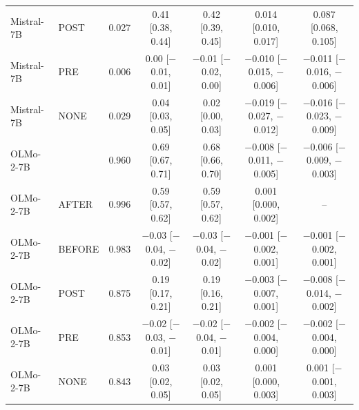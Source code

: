 \begin{tabular}{llccccc}
Mistral-7B & POST & 0.027 & 0.41 [0.38, 0.44] & 0.42 [0.39, 0.45] & 0.014 [0.010, 0.017] & 0.087 [0.068, 0.105] \\
Mistral-7B & PRE & 0.006 & 0.00 [$-$0.01, 0.01] & $-$0.01 [$-$0.02, 0.00] & $-$0.010 [$-$0.015, $-$0.006] & $-$0.011 [$-$0.016, $-$0.006] \\
Mistral-7B & NONE & 0.029 & 0.04 [0.03, 0.05] & 0.02 [0.00, 0.03] & $-$0.019 [$-$0.027, $-$0.012] & $-$0.016 [$-$0.023, $-$0.009] \\
OLMo-2-7B & \fmtOpt{} & 0.960 & 0.69 [0.67, 0.71] & 0.68 [0.66, 0.70] & $-$0.008 [$-$0.011, $-$0.005] & $-$0.006 [$-$0.009, $-$0.003] \\
OLMo-2-7B & AFTER & 0.996 & 0.59 [0.57, 0.62] & 0.59 [0.57, 0.62] & 0.001 [0.000, 0.002] & -- \\
OLMo-2-7B & BEFORE & 0.983 & $-$0.03 [$-$0.04, $-$0.02] & $-$0.03 [$-$0.04, $-$0.02] & $-$0.001 [$-$0.002, 0.001] & $-$0.001 [$-$0.002, 0.001] \\
OLMo-2-7B & POST & 0.875 & 0.19 [0.17, 0.21] & 0.19 [0.16, 0.21] & $-$0.003 [$-$0.007, 0.001] & $-$0.008 [$-$0.014, $-$0.002] \\
OLMo-2-7B & PRE & 0.853 & $-$0.02 [$-$0.03, $-$0.01] & $-$0.02 [$-$0.04, $-$0.01] & $-$0.002 [$-$0.004, 0.000] & $-$0.002 [$-$0.004, 0.000] \\
OLMo-2-7B & NONE & 0.843 & 0.03 [0.02, 0.05] & 0.03 [0.02, 0.05] & 0.001 [0.000, 0.003] & 0.001 [$-$0.001, 0.003] \\
\bottomrule
\end{tabular}
